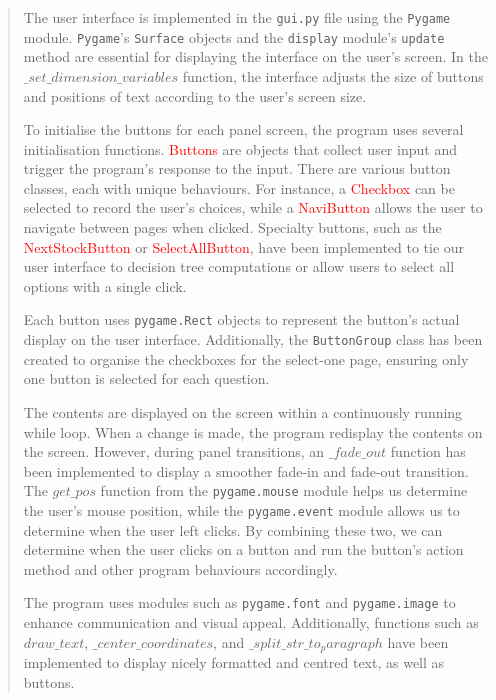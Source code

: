 \documentclass[fontsize=12pt]{article}
\begin{document}
\begin{quote}
\noindent The user interface is implemented in the \texttt{gui.py} file using the \texttt{Pygame} module. \texttt{Pygame}'s \texttt{Surface} objects and the \texttt{display} module's \texttt{update} method are essential for displaying the interface on the user's screen. In the \texttt{$\_set\_dimension\_variables$} function, the interface adjusts the size of buttons and positions of text according to the user's screen size.

To initialise the buttons for each panel screen, the program uses several initialisation functions. \textcolor{red}{Buttons} are objects that collect user input and trigger the program's response to the input. There are various button classes, each with unique behaviours. For instance, a \textcolor{red}{Checkbox} can be selected to record the user's choices, while a \textcolor{red}{NaviButton} allows the user to navigate between pages when clicked. Specialty buttons, such as the \textcolor{red}{NextStockButton} or \textcolor{red}{SelectAllButton}, have been implemented to tie our user interface to decision tree computations or allow users to select all options with a single click.

Each button uses \texttt{pygame.Rect} objects to represent the button's actual display on the user interface. Additionally, the \texttt{ButtonGroup} class has been created to organise the checkboxes for the select-one page, ensuring only one button is selected for each question.

The contents are displayed on the screen within a continuously running while loop. When a change is made, the program redisplay the contents on the screen. However, during panel transitions, an \texttt{$\_fade\_out$} function has been implemented to display a smoother fade-in and fade-out transition. The \texttt{$get\_pos$} function from the \texttt{pygame.mouse} module helps us determine the user's mouse position, while the \texttt{pygame.event} module allows us to determine when the user left clicks. By combining these two, we can determine when the user clicks on a button and run the button's action method and other program behaviours accordingly.

The program uses modules such as \texttt{pygame.font} and \texttt{pygame.image} to enhance communication and visual appeal. Additionally, functions such as \texttt{$draw\_text$}, \texttt{$\_center\_coordinates$}, and \texttt{$\_split\_str\_to_paragraph$} have been implemented to display nicely formatted and centred text, as well as buttons.


\end{quote}
\end{document}
